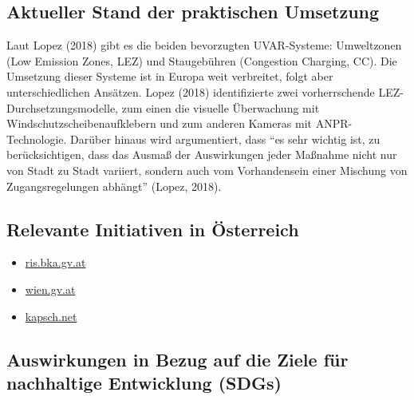 \documentclass[
]{book}
\providecommand{\tightlist}{%
  \setlength{\itemsep}{0pt}\setlength{\parskip}{0pt}}
\begin{document}
\hypertarget{aktueller-stand-der-praktischen-umsetzung-17}{%
\subsection*{Aktueller Stand der praktischen Umsetzung}\label{aktueller-stand-der-praktischen-umsetzung-17}}

Laut Lopez (2018) gibt es die beiden bevorzugten UVAR-Systeme: Umweltzonen (Low Emission Zones, LEZ) und Staugebühren (Congestion Charging, CC). Die Umsetzung dieser Systeme ist in Europa weit verbreitet, folgt aber unterschiedlichen Ansätzen. Lopez (2018) identifizierte zwei vorherrschende LEZ-Durchsetzungsmodelle, zum einen die visuelle Überwachung mit Windschutzscheibenaufklebern und zum anderen Kameras mit ANPR-Technologie. Darüber hinaus wird argumentiert, dass ``es sehr wichtig ist, zu berücksichtigen, dass das Ausmaß der Auswirkungen jeder Maßnahme nicht nur von Stadt zu Stadt variiert, sondern auch vom Vorhandensein einer Mischung von Zugangsregelungen abhängt'' (Lopez, 2018).

\hypertarget{relevante-initiativen-in-uxf6sterreich-17}{%
\subsection*{Relevante Initiativen in Österreich}\label{relevante-initiativen-in-uxf6sterreich-17}}

\begin{itemize}
\tightlist
\item
  \href{https://www.ris.bka.gv.at/GeltendeFassung.wxe?Abfrage=LrW\&Gesetzesnummer=20000270}{ris.bka.gv.at}
\item
  \href{https://www.wien.gv.at/ma22-lgb/luftgi.htm}{wien.gv.at}
\item
  \href{https://www.kapsch.net/ktc/its-solutions/urban-access-management/access-restriction/}{kapsch.net}
\end{itemize}

\hypertarget{auswirkungen-in-bezug-auf-die-ziele-fuxfcr-nachhaltige-entwicklung-sdgs-17}{%
\subsection*{Auswirkungen in Bezug auf die Ziele für nachhaltige Entwicklung (SDGs)}\label{auswirkungen-in-bezug-auf-die-ziele-fuxfcr-nachhaltige-entwicklung-sdgs-17}}
\end{document}
